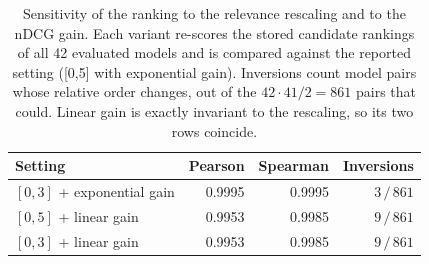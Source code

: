 \begin{table}[t]
    \centering
    \footnotesize
    \renewcommand{\arraystretch}{1.05}
    \setlength{\tabcolsep}{6pt}
    \caption{Sensitivity of the \bench{} ranking to the relevance rescaling and to the nDCG gain. Each variant re-scores the stored candidate rankings of all 42 evaluated models and is compared against the reported setting ([0,5] with exponential gain). Inversions count model pairs whose relative order changes, out of the $42\cdot41/2 = 861$ pairs that could. Linear gain is exactly invariant to the rescaling, so its two rows coincide.}
    \label{tab:rescaling-robustness}
    \begin{tabular}{@{}l r r r@{}}
        \toprule
        Setting & Pearson & Spearman & Inversions \\
        \midrule
        $[0,3]$ + exponential gain & 0.9995 & 0.9995 & $3\,/\,861$ \\
        $[0,5]$ + linear gain & 0.9953 & 0.9985 & $9\,/\,861$ \\
        $[0,3]$ + linear gain & 0.9953 & 0.9985 & $9\,/\,861$ \\
        \bottomrule
    \end{tabular}
\end{table}
